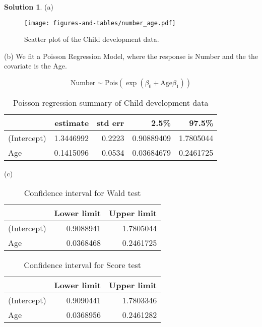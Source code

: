 \documentclass[11pt,letterpaper,english,oneside]{article} %
\theoremstyle{definition} %
\newtheorem{solution}{Solution}
\newenvironment{sol}{\begin{solution}\hspace{0pt}}{\end{solution}}
\begin{document}
\begin{sol}
	(a)
\begin{figure}[ht]
\centering
\texttt{[image: figures-and-tables/number\_age.pdf]}
\caption{Scatter plot of the Child development data.}
\label{fig:number_age}
\end{figure}
	
(b) We fit a Poisson Regression Model, where the response is  Number and the the covariate is the Age.

$$\text{Number}\sim \text{Pois}(\exp(\beta_0+\text{Age}\beta_1))$$
\begin{table}[!h]
	
	\caption{Poisson regression summary of Child development data}
	\centering
	\begin{tabular}[t]{l|r|r|r|r}
		\hline
		& estimate &std err& 2.5\% & 97.5\% \\
		\hline
		(Intercept) & 1.3446992&0.2223 & 0.90889409 & 1.7805044\\
		\hline
		Age & 0.1415096 &0.0534& 0.03684679 & 0.2461725\\
		\hline
	\end{tabular}
	\label{tab:poisson_regression}
\end{table}

(c)

\begin{table}[!h]
	
	\caption{Confidence interval for Wald test}
	\centering
	\begin{tabular}[t]{l|r|r}
		\hline
		& Lower limit & Upper limit\\
		\hline
		(Intercept) & 0.9088941 & 1.7805044\\
		\hline
		Age & 0.0368468 & 0.2461725\\
		\hline
	\end{tabular}
	\label{tab:wald_confint}
\end{table}
\begin{table}[!h]
	
	\caption{Confidence interval for Score test}
	\centering
	\begin{tabular}[t]{l|r|r}
		\hline
		& Lower limit & Upper limit\\
		\hline
		(Intercept) & 0.9090441 & 1.7803346\\
		\hline
		Age & 0.0368956 & 0.2461282\\
		\hline
	\end{tabular}
	\label{tab:score_confint}
\end{table}
\begin{table}[!h]
	

\end{table}
\end{sol}
\end{document}
